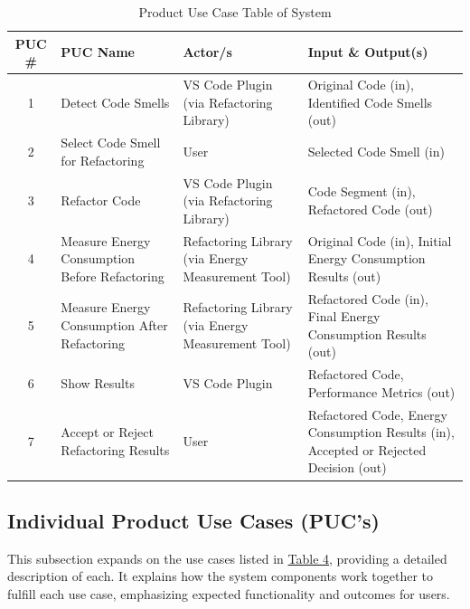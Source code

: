 \documentclass[12pt]{article}
\begin{document}
\setlength\extrarowheight{2mm}

\begin{table}[H]
  \centering
  \begin{tabularx}{\textwidth}{|c|
      >{\raggedright\arraybackslash}X|
      >{\raggedright\arraybackslash}p{1.2in}|
    >{\raggedright\arraybackslash}X|}
    \toprule \textbf{PUC \#} & \textbf{PUC Name} & \textbf{Actor/s} &
    \textbf{Input \& Output(s)} \\
    \midrule
    1 & Detect Code Smells & VS Code Plugin (via Refactoring Library)
    & Original Code (in), Identified Code Smells (out) \\
    2 & Select Code Smell for Refactoring & User & Selected Code Smell (in) \\
    3 & Refactor Code & VS Code Plugin (via Refactoring Library) &
    Code Segment (in), Refactored Code (out) \\
    4 & Measure Energy Consumption Before Refactoring & Refactoring
    Library (via Energy Measurement Tool) & Original Code (in),
    Initial Energy Consumption Results (out) \\
    5 & Measure Energy Consumption After Refactoring & Refactoring
    Library (via Energy Measurement Tool) & Refactored Code (in),
    Final Energy Consumption Results (out) \\
    6 & Show Results & VS Code Plugin & Refactored Code, Performance
    Metrics (out) \\
    7 & Accept or Reject Refactoring Results & User & Refactored
    Code, Energy Consumption Results (in), Accepted or Rejected
    Decision (out) \\
    \bottomrule
  \end{tabularx}
  \caption{Product Use Case Table of System}
  \label{tab:puc}
\end{table}

\subsection{Individual Product Use Cases (PUC's)}
This subsection expands on the use cases listed in
\hyperref[tab:puc]{Table 4}, providing a detailed description of
each. It explains how the system components work together to fulfill
each use case, emphasizing expected functionality and outcomes for users.
\end{document}
